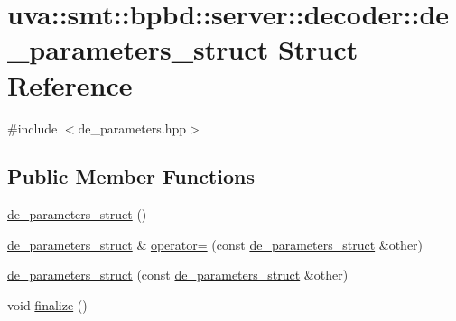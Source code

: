\hypertarget{structuva_1_1smt_1_1bpbd_1_1server_1_1decoder_1_1de__parameters__struct}{}\section{uva\+:\+:smt\+:\+:bpbd\+:\+:server\+:\+:decoder\+:\+:de\+\_\+parameters\+\_\+struct Struct Reference}
\label{structuva_1_1smt_1_1bpbd_1_1server_1_1decoder_1_1de__parameters__struct}


{\ttfamily \#include $<$de\+\_\+parameters.\+hpp$>$}

\subsection*{Public Member Functions}
\begin{DoxyCompactItemize}
\item 
\hyperlink{structuva_1_1smt_1_1bpbd_1_1server_1_1decoder_1_1de__parameters__struct_af25621142970221b3db967627f51a7da}{de\+\_\+parameters\+\_\+struct} ()
\item 
\hyperlink{structuva_1_1smt_1_1bpbd_1_1server_1_1decoder_1_1de__parameters__struct}{de\+\_\+parameters\+\_\+struct} \& \hyperlink{structuva_1_1smt_1_1bpbd_1_1server_1_1decoder_1_1de__parameters__struct_a503556f04717cbe8e65da2414eb93a8d}{operator=} (const \hyperlink{structuva_1_1smt_1_1bpbd_1_1server_1_1decoder_1_1de__parameters__struct}{de\+\_\+parameters\+\_\+struct} \&other)
\item 
\hyperlink{structuva_1_1smt_1_1bpbd_1_1server_1_1decoder_1_1de__parameters__struct_a0d91b0ccf12bf3cd1422aabbbfcaa593}{de\+\_\+parameters\+\_\+struct} (const \hyperlink{structuva_1_1smt_1_1bpbd_1_1server_1_1decoder_1_1de__parameters__struct}{de\+\_\+parameters\+\_\+struct} \&other)
\item 
void \hyperlink{structuva_1_1smt_1_1bpbd_1_1server_1_1decoder_1_1de__parameters__struct_ac14e57a3bed67ccd90355f950bfb4135}{finalize} ()
\end{DoxyCompactItemize}
